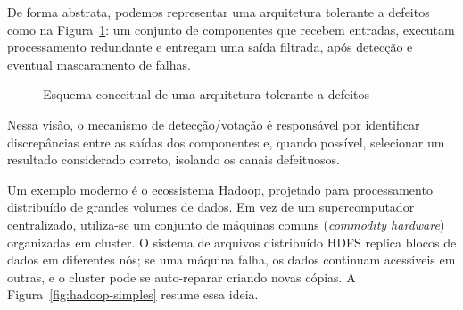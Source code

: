 \documentclass[12pt,a4paper,twoside]{report}
\begin{document}
De forma abstrata, podemos representar uma arquitetura tolerante a defeitos
como na Figura~\ref{fig:arquitetura-tolerante-defeitos}: um conjunto de
componentes que recebem entradas, executam processamento redundante e
entregam uma saída filtrada, após detecção e eventual mascaramento de
falhas.

\begin{figure}[h]
    \centering
    \caption{Esquema conceitual de uma arquitetura tolerante a defeitos}
    \label{fig:arquitetura-tolerante-defeitos}
\end{figure}

Nessa visão, o mecanismo de detecção/votação é responsável por identificar
discrepâncias entre as saídas dos componentes e, quando possível, selecionar
um resultado considerado correto, isolando os canais defeituosos.

Um exemplo moderno é o ecossistema Hadoop, projetado para processamento
distribuído de grandes volumes de dados. Em vez de um supercomputador
centralizado, utiliza-se um conjunto de máquinas comuns (\emph{commodity
hardware}) organizadas em cluster. O sistema de arquivos distribuído HDFS
replica blocos de dados em diferentes nós; se uma máquina falha, os dados
continuam acessíveis em outras, e o cluster pode se auto-reparar criando
novas cópias. A Figura~\ref{fig:hadoop-simples} resume essa ideia.
\end{document}

